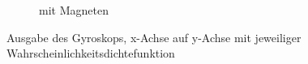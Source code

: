 \begin{landscape}
\begin{figure}[htb]
\begin{subfigure}[c]{.45\linewidth}
				\caption{mit Magneten} \label{Gyr_mit}
			\end{subfigure}
		\caption{Ausgabe des Gyroskops, x-Achse auf y-Achse mit jeweiliger Wahrscheinlichkeitsdichtefunktion}\label{Gyr}
	\end{figure}
\end{landscape}